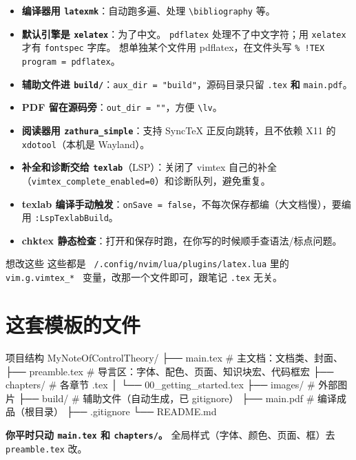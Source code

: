 \begin{itemize}
  \item \textbf{编译器用 \texttt{latexmk}}：自动跑多遍、处理 \texttt{\textbackslash bibliography} 等。
  \item \textbf{默认引擎是 \texttt{xelatex}}：为了中文。
        \texttt{pdflatex} 处理不了中文字符；用 \texttt{xelatex} 才有 \texttt{fontspec} 字库。
        想单独某个文件用 pdflatex，在文件头写 \texttt{\% !TEX program = pdflatex}。
  \item \textbf{辅助文件进 \texttt{build/}}：\texttt{aux\_dir = "build"}，源码目录只留 \texttt{.tex} \textbf{和} \texttt{main.pdf}。
  \item \textbf{PDF 留在源码旁}：\texttt{out\_dir = ""}，方便 \texttt{\textbackslash lv}。
  \item \textbf{阅读器用 \texttt{zathura\_simple}}：支持 SyncTeX 正反向跳转，且不依赖 X11 的 \texttt{xdotool}（本机是 Wayland）。
  \item \textbf{补全和诊断交给 \texttt{texlab}}（LSP）：关闭了 vimtex 自己的补全（\texttt{vimtex\_complete\_enabled=0}）和诊断队列，避免重复。
  \item \textbf{texlab 编译手动触发}：\texttt{onSave = false}，不每次保存都编（大文档慢），要编用 \texttt{:LspTexlabBuild}。
  \item \textbf{chktex 静态检查}：打开和保存时跑，在你写的时候顺手查语法/标点问题。
\end{itemize}

\begin{notebox}[og]{想改这些}
这些都是 \texttt{~/.config/nvim/lua/plugins/latex.lua} 里的 \texttt{vim.g.vimtex\_* } 变量，改那一个文件即可，跟笔记 \texttt{.tex} 无关。
\end{notebox}

\section{这套模板的文件}

\begin{codebox}[text]{项目结构}
MyNoteOfControlTheory/
├── main.tex        # 主文档：文档类、封面、
├── preamble.tex    # 导言区：字体、配色、页面、知识块宏、代码框宏
├── chapters/       # 各章节 .tex
│   └── 00_getting_started.tex
├── images/         # 外部图片
├── build/          # 辅助文件（自动生成，已 gitignore）
├── main.pdf        # 编译成品（根目录）
├── .gitignore
└── README.md
\end{codebox}

\textbf{你平时只动 \texttt{main.tex} 和 \texttt{chapters/}。} 全局样式（字体、颜色、页面、框）去 \texttt{preamble.tex} 改。

